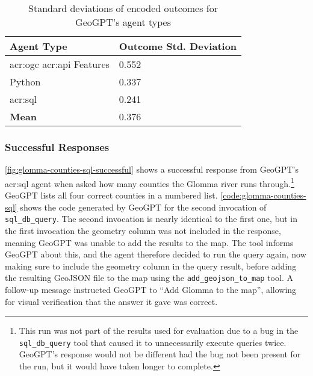 \begin{table}[htbp]
    \centering
    \caption{Standard deviations of encoded outcomes for GeoGPT's agent types}
    \label{tbl:stddev-by-agent-type}
    \begin{tabularx}{0.7\textwidth}{XX}
        \toprule
        \textbf{Agent Type}                            & \textbf{Outcome Std. Deviation} \\
        \midrule
        \acrshort{acr:ogc} \acrshort{acr:api} Features & 0.552                           \\
        Python                                         & 0.337                           \\
        \acrshort{acr:sql}                             & 0.241                           \\
        \midrule
        \textbf{Mean}                                  & 0.376                           \\
        \bottomrule
    \end{tabularx}
\end{table}

\FloatBarrier

\subsubsection{Successful Responses}

\autoref{fig:glomma-counties-sql-successful} shows a successful response from GeoGPT's \acrshort{acr:sql} agent when asked how many counties the Glomma river runs through.\footnote{This run was not part of the results used for evaluation due to a bug in the \texttt{sql\_db\_query} tool that caused it to unnecessarily execute queries twice. GeoGPT's response would not be different had the bug not been present for the run, but it would have taken longer to complete.} GeoGPT lists all four correct counties in a numbered list. \autoref{code:glomma-counties-sql} shows the code generated by GeoGPT for the second invocation of \texttt{sql\_db\_query}. The second invocation is nearly identical to the first one, but in the first invocation the geometry column was not included in the response, meaning GeoGPT was unable to add the results to the map. The tool informs GeoGPT about this, and the agent therefore decided to run the query again, now making sure to include the geometry column in the query result, before adding the resulting GeoJSON file to the map using the \texttt{add\_geojson\_to\_map} tool. A follow-up message instructed GeoGPT to \enquote{Add Glomma to the map}, allowing for visual verification that the answer it gave was correct.

